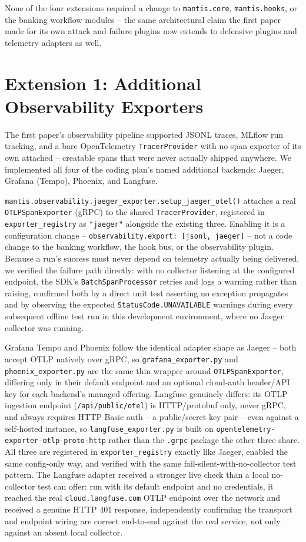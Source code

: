 \documentclass[conference]{IEEEtran}
\begin{document}
None of the four extensions required a change to \texttt{mantis.core}, \texttt{mantis.hooks}, or the banking workflow modules -- the same architectural claim the first paper made for its own attack and failure plugins now extends to defensive plugins and telemetry adapters as well.

\section{Extension 1: Additional Observability Exporters}

The first paper's observability pipeline supported JSONL traces, MLflow run tracking, and a bare OpenTelemetry \texttt{TracerProvider} with no span exporter of its own attached -- creatable spans that were never actually shipped anywhere. We implemented all four of the coding plan's named additional backends: Jaeger, Grafana (Tempo), Phoenix, and Langfuse.

\texttt{mantis.observability.jaeger\_exporter.setup\_jaeger\_otel()} attaches a real \texttt{OTLPSpanExporter} (gRPC) to the shared \texttt{TracerProvider}, registered in \texttt{exporter\_registry} as \texttt{"jaeger"} alongside the existing three. Enabling it is a configuration change -- \texttt{observability.export: [jsonl, jaeger]} -- not a code change to the banking workflow, the hook bus, or the observability plugin. Because a run's success must never depend on telemetry actually being delivered, we verified the failure path directly: with no collector listening at the configured endpoint, the SDK's \texttt{BatchSpanProcessor} retries and logs a warning rather than raising, confirmed both by a direct unit test asserting no exception propagates and by observing the expected \texttt{StatusCode.UNAVAILABLE} warnings during every subsequent offline test run in this development environment, where no Jaeger collector was running.

Grafana Tempo and Phoenix follow the identical adapter shape as Jaeger -- both accept OTLP natively over gRPC, so \texttt{grafana\_exporter.py} and \texttt{phoenix\_exporter.py} are the same thin wrapper around \texttt{OTLPSpanExporter}, differing only in their default endpoint and an optional cloud-auth header/API key for each backend's managed offering. Langfuse genuinely differs: its OTLP ingestion endpoint (\texttt{/api/public/otel}) is HTTP/protobuf only, never gRPC, and always requires HTTP Basic auth -- a public/secret key pair -- even against a self-hosted instance, so \texttt{langfuse\_exporter.py} is built on \texttt{opentelemetry-exporter-otlp-proto-http} rather than the \texttt{.grpc} package the other three share. All three are registered in \texttt{exporter\_registry} exactly like Jaeger, enabled the same config-only way, and verified with the same fail-silent-with-no-collector test pattern. The Langfuse adapter received a stronger live check than a local no-collector test can offer: run with its default endpoint and no credentials, it reached the real \texttt{cloud.langfuse.com} OTLP endpoint over the network and received a genuine HTTP 401 response, independently confirming the transport and endpoint wiring are correct end-to-end against the real service, not only against an absent local collector.
\end{document}
